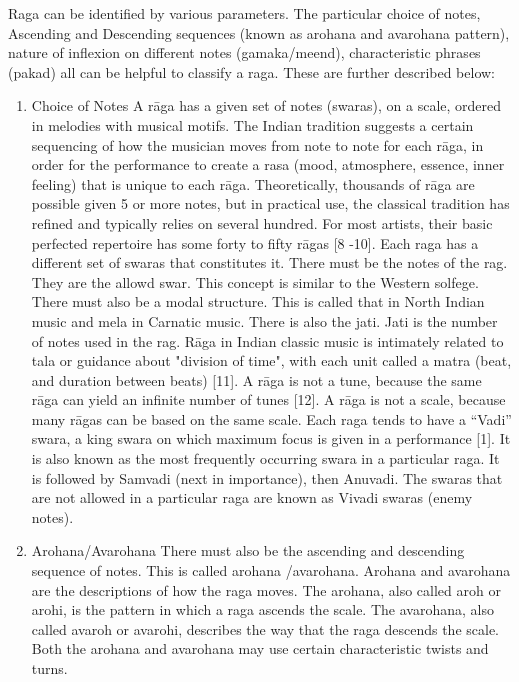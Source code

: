 \doublespacing
\setlength{\parindent}{1cm}

\par

Raga can be identified by various parameters. The particular choice of notes, Ascending and Descending sequences (known as arohana and avarohana pattern), nature of inflexion on different notes (gamaka/meend), characteristic phrases (pakad) all can be helpful to classify a raga. These are further described below:

\begin{enumerate}
  \item Choice of Notes
  A rāga has a given set of notes (swaras), on a scale, ordered in melodies with musical motifs. The Indian tradition suggests a certain sequencing of how the musician moves from note to note for each rāga, in order for the performance to create a rasa (mood, atmosphere, essence, inner feeling) that is unique to each rāga. Theoretically, thousands of rāga are possible given 5 or more notes, but in practical use, the classical tradition has refined and typically relies on several hundred. For most artists, their basic perfected repertoire has some forty to fifty rāgas [8 -10]. Each raga has a different set of swaras that constitutes it. There must be the notes of the rag.  They are the allowd swar.  This concept is similar to the Western solfege. There must also be a modal structure.  This is called that in North Indian music and mela in Carnatic music. There is also the jati.  Jati is the number of notes used in the rag. Rāga in Indian classic music is intimately related to tala or guidance about "division of time", with each unit called a matra (beat, and duration between beats) [11]. A rāga is not a tune, because the same rāga can yield an infinite number of tunes [12].  A rāga is not a scale, because many rāgas can be based on the same scale. Each raga tends to have  a “Vadi” swara, a king swara on which maximum focus is given in a performance [1].  It is also known as the most frequently occurring swara in a particular raga. It is followed by Samvadi (next in importance), then Anuvadi.  The swaras that are not allowed in a particular raga are known as Vivadi swaras (enemy notes).
  \par
  \item Arohana/Avarohana
  There must also be the ascending and descending sequence of notes.  This is called arohana /avarohana. Arohana and avarohana are the descriptions of how the raga moves.  The arohana, also called aroh or arohi, is the pattern in which a raga ascends the scale.  The avarohana, also called avaroh or avarohi, describes the way that the raga descends the scale.  Both the arohana and avarohana may use certain characteristic twists and turns.

\end{enumerate}
